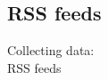 \documentclass{beamer}
\begin{document}
%
%




\subsection{RSS feeds}
\begin{frame}
	Collecting data:\\
	RSS feeds
\end{frame}
\end{document}
